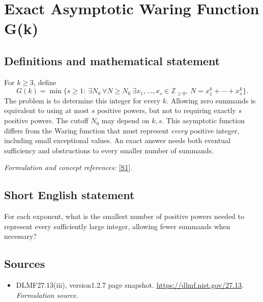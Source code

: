 \documentclass[11pt]{article}
\begin{document}
\section*{\texorpdfstring{Exact Asymptotic Waring Function G(k)}{Exact Asymptotic Waring Function G(k)}}\label{30006788}
\subsection{Definitions and mathematical statement}
For $k\ge3$, define
\[
 G(k)=\min\{s\ge1:\ \exists N_0\ \forall N\ge N_0\
 \exists x_1,\ldots,x_s\in{\mathbb{Z}}_{\ge0},\ N=x_1^k+\cdots+x_s^k\}.
\]
The problem is to determine this integer for every $k$. Allowing zero summands is equivalent to using at most $s$ positive powers, but not to requiring exactly $s$ positive powers. The cutoff $N_0$ may depend on $k,s$. This asymptotic function differs from the Waring function that must represent \emph{every} positive integer, including small exceptional values. An exact answer needs both eventual sufficiency and obstructions to every smaller number of summands.
\par\smallskip\textit{Formulation and concept references:} \href{https://dlmf.nist.gov/27.13}{[S1]}.

\subsection{Short English statement}
For each exponent, what is the smallest number of positive powers needed to represent every sufficiently large integer, allowing fewer summands when necessary?
\subsection{Sources}
\begin{itemize}
\item[S1]DLMF27.13(iii), version1.2.7 page snapshot.
\url{https://dlmf.nist.gov/27.13}.
\textit{Formulation source.}
\end{itemize}
\end{document}
